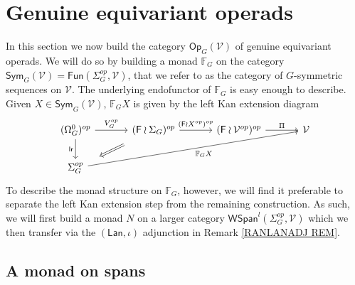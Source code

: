 \documentclass[a4paper,10pt]{article}%
\begin{document}
\section{Genuine equivariant operads}\label{GENUINE_OP_MONAD_SECTION}


In this section we now build the category 
$\mathsf{Op}_G (\mathcal{V})$
of genuine equivariant operads.
We will do so by building a monad $\mathbb{F}_G$
on the category
$\mathsf{Sym}_G(\mathcal{V}) = 
\mathsf{Fun}(\Sigma_G^{op},\mathcal{V})$,
that we refer to as the category of $G$-symmetric sequences on $\mathcal{V}$. The underlying endofunctor of $\mathbb{F}_G$ is easy enough to describe. Given $X \in \mathsf{Sym}_G(\mathcal{V})$, $\mathbb{F}_G X$ is given by the left Kan extension diagram
\begin{equation}\label{FGXDEF EQ}
\begin{tikzcd}[row sep=2em,column sep = 3.3em]
	(\Omega_{G}^{0})^{op} \ar{r}{V_{G}^{op}} \ar{d}[swap]{\mathsf{lr}} &
	|[alias=F1]|
(\Fin \wr \Sigma_G)^{op} \ar{r}[swap,name=F2]{}{(\Fin \wr X^{op})^{op}}& (\Fin \wr \mathcal{V}^{op})^{op} \ar{r}{\Pi} & \mathcal{V}
\\
	|[alias=G2]|
	\Sigma_G^{op}  \ar{urrr}[swap]{\mathbb{F}_G X} & &
\arrow[Rightarrow, from=F1, to=G2,shorten >=0.45cm,shorten <=0.45cm]
\end{tikzcd}
\end{equation}
To describe the monad structure on $\mathbb{F}_G$, however, we will find it preferable to separate the left Kan extension 
step from the remaining construction.
As such, we will first build a monad 
$N$ on a larger category
$\mathsf{WSpan}^l(\Sigma_G^{op},\mathcal{V})$
which we then transfer via the $(\mathsf{Lan},\iota)$ adjunction in Remark \ref{RANLANADJ REM}.



\subsection{A monad on spans}
\end{document}
